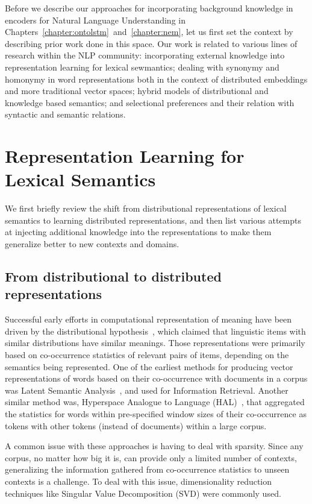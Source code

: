 Before we describe our approaches for incorporating background knowledge in encoders for Natural Language
Understanding in Chapters~\ref{chapter:ontolstm}~and~\ref{chapter:nem}, let us first set the context by describing
prior work done in this space. Our work is related to various lines of research within the NLP community:
incorporating external knowledge into representation learning for lexical sewmantics; dealing with synonymy and
homonymy in word representations both in the context of distributed embeddings and more traditional vector spaces;
hybrid models of distributional and knowledge based semantics; and selectional preferences and their relation with
syntactic and semantic relations.

\section{Representation Learning for Lexical Semantics}
We first briefly review the shift from distributional representations of lexical semantics to learning distributed
representations, and then list various attempts at injecting additional knowledge into the representations to make
them generalize better to new contexts and domains.

\subsection{From distributional to distributed representations}
Successful early efforts in computational representation of meaning have been driven by the distributional
hypothesis~\citep{Firth1957}, which claimed that linguistic items with similar distributions have similar meanings.
Those representations were primarily based on co-occurrence statistics of relevant pairs of items, depending on the
semantics being represented. One of the earliest methods for producing vector representations of words based on
their co-occurrence with documents in a corpus was Latent Semantic Analysis~\citep{deerwester1990indexing},
and used for Information Retrieval. Another similar method was, Hyperspace Analogue to Language
(HAL)~\citep{lund1996producing}, that aggregated the statistics for words within pre-specified window sizes of
their co-occurrence as tokens with other tokens (instead of documents) within a large corpus.

A common issue with these approaches is having to deal with sparsity. Since any corpus, no matter how big it is,
can provide only a limited number of contexts, generalizing the information gathered from co-occurrence statistics to
unseen contexts is a challenge. To deal with this issue, dimensionality reduction techniques like Singular Value
Decomposition (SVD) were commonly used.

